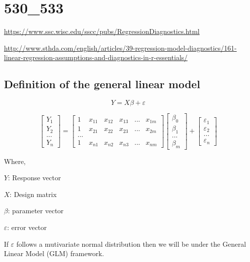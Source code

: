 \documentclass[]{book}
\begin{document}
\hypertarget{section-2}{%
\chapter{530\_533}\label{section-2}}

\url{https://www.ssc.wisc.edu/sscc/pubs/RegressionDiagnostics.html}

\url{http://www.sthda.com/english/articles/39-regression-model-diagnostics/161-linear-regression-assumptions-and-diagnostics-in-r-essentials/}

\hypertarget{definition-of-the-general-linear-model}{%
\section{Definition of the general linear model}\label{definition-of-the-general-linear-model}}

\[Y=X\beta+\varepsilon\]

\[\begin{bmatrix}
Y_1 \\
Y_2  \\
...\\
Y_n \end{bmatrix}=\begin{bmatrix}
1 & x_{11} & x_{12} & x_{13} & ... & x_{1m}\\
1 & x_{21} & x_{22} & x_{23} & ... & x_{2m} \\
...\\
1 & x_{n1} & x_{n2} & x_{n3} & ... & x_{nm}
\end{bmatrix} \begin{bmatrix}
\beta_0 \\
\beta_1  \\
...\\
\beta_m \end{bmatrix}+\begin{bmatrix}
\varepsilon_1 \\ \varepsilon_2 \\
...\\
\varepsilon_n  \end{bmatrix}\]

Where,

\(Y\): Response vector

\(X\): Design matrix

\(\beta\): parameter vector

\(\varepsilon\): error vector

If \(\varepsilon\) follows a mutivariate normal distribution then we will be under the General Linear Model (GLM) framework.
\end{document}
